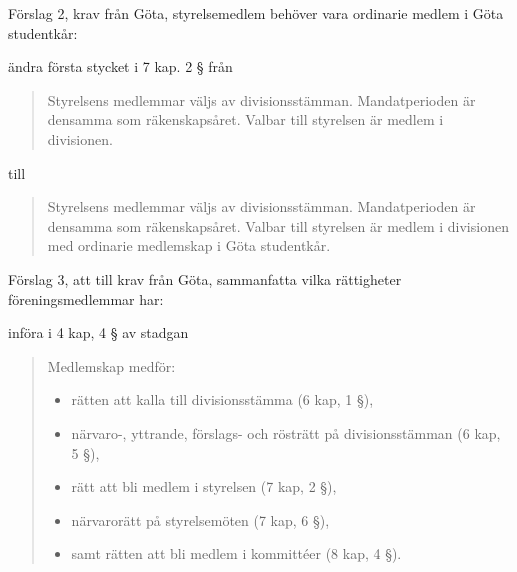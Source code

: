 \documentclass[protokoll]{dvd}
\begin{document}
Förslag 2, krav från Göta, styrelsemedlem behöver vara ordinarie medlem i Göta studentkår:
\begin{attsatser}
    \item ändra första stycket i 7 kap. 2 § från
    \begin{quote}
        Styrelsens medlemmar väljs av divisionsstämman. Mandatperioden är densamma som räkenskapsåret. Valbar till styrelsen är medlem i divisionen.
    \end{quote}
    till
    \begin{quote}
        Styrelsens medlemmar väljs av divisionsstämman. Mandatperioden är densamma som räkenskapsåret. Valbar till styrelsen är medlem i divisionen med ordinarie medlemskap i Göta studentkår.
    \end{quote}
\end{attsatser}

Förslag 3, att till krav från Göta, sammanfatta vilka rättigheter föreningsmedlemmar har:
\begin{attsatser}
    \item införa i 4 kap, 4 § av stadgan 
    \begin{quote}
        Medlemskap medför: 
        \begin{itemize}
            \item rätten att kalla till divisionsstämma (6 kap, 1 §),
            \item närvaro-, yttrande, förslags- och rösträtt på divisionsstämman (6 kap, 5 §),
            \item rätt att bli medlem i styrelsen (7 kap, 2 §),
            \item närvarorätt på styrelsemöten (7 kap, 6 §),
            \item samt rätten att bli medlem i kommittéer (8 kap, 4 §). 
        \end{itemize}
    \end{quote}
\end{attsatser}
\end{document}
